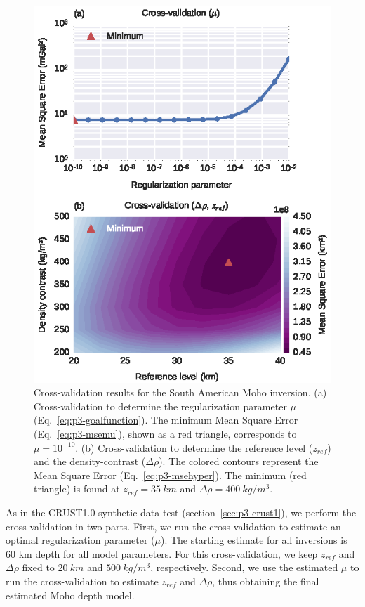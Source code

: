 \begin{figure}
    \centering
    \includegraphics{figures/paper-moho/south-america-cv}
    \caption{
        Cross-validation results for the South American Moho inversion.
        (a) Cross-validation to determine the regularization parameter $\mu$
        (Eq.~\ref{eq:p3-goalfunction}).
        The minimum Mean Square Error (Eq.~\ref{eq:p3-msemu}),
        shown as a red triangle,
        corresponds to $\mu = 10^{-10}$.
        (b) Cross-validation to determine
        the reference level ($z_{ref}$) and the density-contrast ($\Delta\rho$).
        The colored contours represent
        the Mean Square Error (Eq.~\ref{eq:p3-msehyper}).
        The minimum (red triangle) is found at $z_{ref} = 35\ km$
        and $\Delta\rho = 400\ kg/m^3$.
    }
    \label{fig:p3-sam-cv}
\end{figure}



As in the CRUST1.0 synthetic data test (section~\ref{sec:p3-crust1}),
we perform the cross-validation in two parts.
First, we run the cross-validation to estimate
an optimal regularization parameter ($\mu$).
The starting estimate for all inversions is
60 km depth for all model parameters.
For this cross-validation,
we keep $z_{ref}$ and $\Delta\rho$ fixed to
$20\ km$ and $500\ kg/m^3$, respectively.
Second, we use the estimated $\mu$ to run the cross-validation
to estimate $z_{ref}$ and $\Delta\rho$,
thus obtaining the final estimated Moho depth model.

